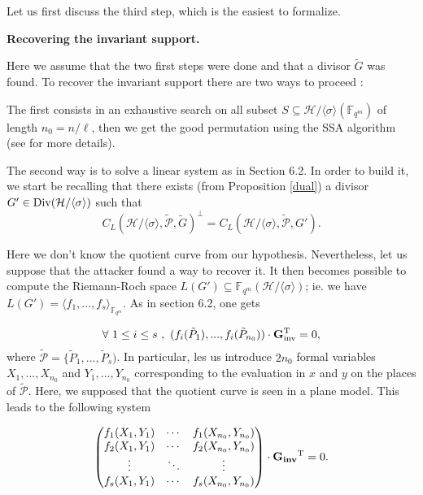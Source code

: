 \documentclass[10pt]{article}
\newcommand{\s}{\vspace{0.3cm}}
\newcommand{\cd}{\cdot}
\newcommand{\fqm}{\mathbb{F}_{q^m}}
\newcommand{\su}{\subseteq}
\newcommand{\PR}{\mathcal{P}}
\newcommand{\Div}{\operatorname{Div}}
\begin{document}
Let us first discuss the third step, which is the easiest to formalize.

\s

\bf{Recovering the invariant support.}
\s

\rm  Here we assume that the two first steps were done and that a divisor $\tilde{G}$ was found. To recover the invariant support there are two ways to proceed :

\s

The first consists in an exhaustive search on all subset $S \su \mathcal{H}/\langle \sigma \rangle\left(\fqm\right)$ of length $n_0=n/\ell$, then we get the good permutation using the SSA algorithm (see \cite{SSA} for more details).

\s

The second way is to solve a linear system as in Section 6.2. In order to build it, we start be recalling that there exists (from Proposition \ref{dual}) a divisor $G' \in \rm \Div \it (\mathcal{H}/\langle \sigma \rangle)$ such that 
\[ C_L(\mathcal{H}/\langle \sigma \rangle,\tilde{\PR},\tilde{G})^{\perp} = C_L(\mathcal{H}/\langle \sigma \rangle,\tilde{\PR},G').\]

Here we don't know the quotient curve from our hypothesis. Nevertheless, let us suppose that the attacker found a way to recover it. It then becomes possible to compute the Riemann-Roch space $L(G') \su \fqm(\mathcal{H}/\langle \sigma \rangle)$;
ie. we have $L(G') = \langle f_1,...,f_s \rangle_{\fqm}$. As in section 6.2, one gets 

\begin{equation*}
\forall \ 1 \leq i \leq s \ , \ (f_i(\tilde{P}_1),...,f_i(\tilde{P}_{n_0})) \cd \bf{G}\rm ^T_{inv} = 0,
\end{equation*}
where $\tilde{\PR} = \{\tilde{P}_1,...,\tilde{P}_s)$. In particular, les us introduce $2n_0$ formal variables $X_1,...,X_{n_0}$ and $Y_1,...,Y_{n_0}$ corresponding to the evaluation in $x$ and $y$ on the places of $\tilde{\PR}$. Here, we supposed that the quotient curve is seen in a plane model. This leads to the following system

\begin{equation*}
\begin{pmatrix}
f_1(X_1,Y_1) & \cdots & f_1(X_{n_0},Y_{n_0}) \\
f_2(X_1,Y_1) & \cdots & f_2(X_{n_0},Y_{n_0}) \\
\vdots & \ddots & \vdots \\
f_s(X_1,Y_1) & \cdots & f_s(X_{n_0},Y_{n_0}) \\
\end{pmatrix}
\cd \bf{G_{inv}} \rm{^T} = 0.
\end{equation*}
\end{document}
